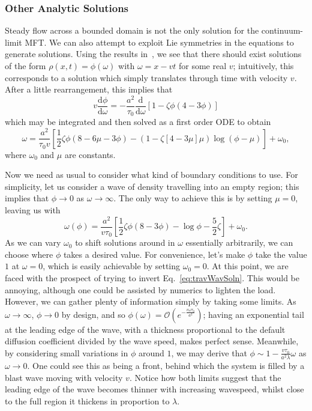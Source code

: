 \subsubsection{Other Analytic Solutions}
Steady flow across a bounded domain is not the only solution for the continuum-limit MFT. We can also attempt to exploit Lie symmetries in the equations to generate solutions. Using the results in~\cite{ivanova2007},
we see that there should exist solutions of the form $\rho(x, t) = \phi(\omega)$ with $\omega = x-vt$ for some real $v$; intuitively, this corresponds to a solution which simply translates through time with velocity $v$.
After a little rearrangement, this implies that
\begin{equation}
 v \frac{\mathrm{d}\phi}{\mathrm{d}\omega} = -\frac{a^2}{\tau_0} \frac{\mathrm{d}}{\mathrm{d}\omega}\left[ 1-\zeta \phi \left(4-3\phi\right) \right]
\end{equation}
which may be integrated and then solved as a first order ODE to obtain
\begin{equation}
 \omega = \frac{a^2}{\tau_0 v} \left[ \frac{1}{2} \zeta \phi \left(8-6\mu-3\phi\right) - \left(1-\zeta\left[4-3\mu\right]\mu\right) \log{\left(\phi-\mu\right)} \right] + \omega_0,
\end{equation}
where $\omega_0$ and $\mu$ are constants.

Now we need as usual to consider what kind of boundary conditions to use. For simplicity, let us consider a wave of density travelling into an empty region; this implies that $\phi \rightarrow 0$ as $\omega \rightarrow \infty$.
The only way to achieve this is by setting $\mu=0$, leaving us with
\begin{equation}
\label{eq:travWavSoln}
 \omega(\phi) = \frac{a^2}{v\tau_0} \left[ \frac{1}{2}\zeta \phi(8-3\phi) - \log{\phi} - \frac{5}{2}\zeta \right] + \omega_0.
\end{equation}
As we can vary $\omega_0$ to shift solutions around in $\omega$ essentially arbitrarily, we can choose where $\phi$ takes a desired value. For convenience, let's make $\phi$ take the value $1$ at $\omega=0$, which is easily
achievable by setting $\omega_0 = 0$. At this point, we are faced with the prospect of trying to invert Eq.~\ref{eq:travWavSoln}. This would be annoying, although one could be assisted by numerics to lighten the load.
However, we can gather plenty of information simply by taking some limits. As $\omega \rightarrow \infty$, $\phi \rightarrow 0$ by design, and so $\phi(\omega) = \mathcal{O}(e^{-\frac{v\omega\tau_0}{a^2}})$; having an
exponential tail at the leading edge of the wave, with a thickness proportional to the default diffusion coefficient divided by the wave speed, makes perfect sense. Meanwhile, by considering small variations in $\phi$ around $1$,
we may derive that $\phi \sim 1-\frac{v \tau_0}{a^2 \lambda} \omega$ as $\omega \rightarrow 0$. One could see this as being a front, behind which the system is filled by a blast wave moving with velocity $v$. Notice how both
limits suggest that the leading edge of the wave becomes thinner with increasing wavespeed, whilst close to the full region it thickens in proportion to $\lambda$.

